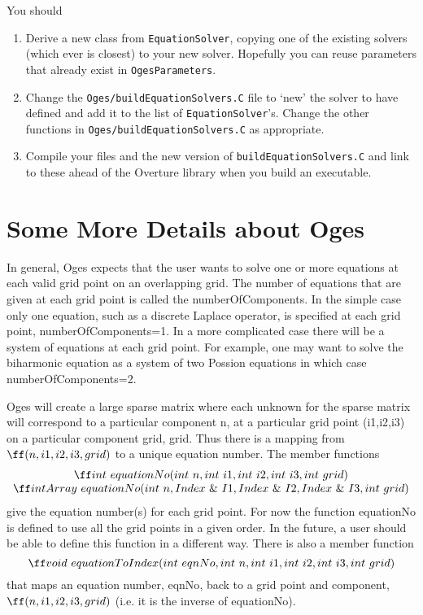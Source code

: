 \documentclass[11pt]{article}
\begin{document}
You should
\begin{enumerate}
  \item Derive a new class from {\tt EquationSolver}, copying one of the existing solvers (which ever
is closest) to your new solver. Hopefully you can reuse parameters that already exist in {\tt OgesParameters}.
  \item Change the {\tt Oges/buildEquationSolvers.C} file to `new' the solver to have defined and add it
    to the list of {\tt EquationSolver}'s. Change the other functions in {\tt Oges/buildEquationSolvers.C}
    as appropriate.
  \item Compile your files and the new version of {\tt buildEquationSolvers.C} and link to these
    ahead of the Overture library when you build an executable. 
\end{enumerate}

\section{Some More Details about Oges}

In general, Oges expects that the user wants to solve one or more
equations at each valid grid point on an overlapping grid.  The number
of equations that are given at each grid point is called the {\ff
numberOfComponents}.  In the simple case only one equation, such as a
discrete Laplace operator, is specified at each grid point, {\ff
numberOfComponents=1}.  In a more complicated case there will be a
system of equations at each grid point. For example, one may want to
solve the biharmonic equation as a system of two Possion equations in
which case {\ff numberOfComponents=2}.

Oges will create a large sparse matrix where each unknown 
for the sparse matrix will correspond to a particular
component {\ff n},
at a particular
grid point ({\ff i1,i2,i3}) on a particular component
grid, {\ff grid}.
Thus there is a mapping from 
${\ff (n,i1,i2,i3,grid)}$ to a unique equation number.
The member functions 
$$
\begin{array}{c}
{\ff int~equationNo(int~n, int~i1, int~i2, int~i3, int~grid)}  \\
{\ff intArray~equationNo(int~n, Index~\&~I1, Index~\&~I2, Index~\&~I3, int~grid)} 
\end{array}
$$
give the equation number(s) for each grid point.
For now the function {\ff equationNo} is defined to use all the grid points
in a given order. In the future, a user should be able to define this
function in a different way. There is also a member function
$$
{\ff void~equationToIndex( int~eqnNo, int~n, int~i1, int~i2, int~i3, int~grid)}
$$ 
that maps an equation number, {\ff eqnNo},  back to a
grid point and component, ${\ff (n,i1,i2,i3,grid)}$ (i.e. it is the
inverse of {\ff equationNo}).
\end{document}
